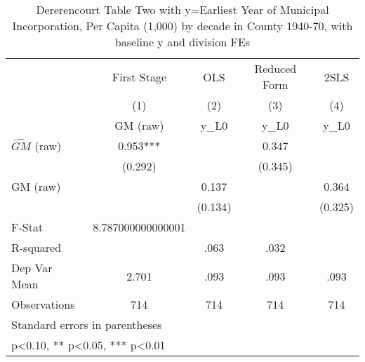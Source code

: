 \begin{table}[htbp]\centering
\def\sym#1{\ifmmode^{#1}\else\(^{#1}\)\fi}
\caption{Dererencourt Table Two with y=Earliest Year of Municipal Incorporation, Per Capita (1,000) by decade in County 1940-70, with baseline y and division FEs}
\begin{tabular}{l*{4}{c}}
\toprule
                    & First Stage   &         OLS   &Reduced Form   &        2SLS   \\
                    &\multicolumn{1}{c}{(1)}&\multicolumn{1}{c}{(2)}&\multicolumn{1}{c}{(3)}&\multicolumn{1}{c}{(4)}\\
                    &\multicolumn{1}{c}{GM  (raw)}&\multicolumn{1}{c}{y\_L0}&\multicolumn{1}{c}{y\_L0}&\multicolumn{1}{c}{y\_L0}\\
\midrule
$\hat{GM}$ (raw)    &       0.953***&               &       0.347   &               \\
                    &     (0.292)   &               &     (0.345)   &               \\
\addlinespace
GM  (raw)           &               &       0.137   &               &       0.364   \\
                    &               &     (0.134)   &               &     (0.325)   \\
\midrule
F-Stat              &8.787000000000001   &               &               &               \\
R-squared           &               &        .063   &        .032   &               \\
Dep Var Mean        &       2.701   &        .093   &        .093   &        .093   \\
Observations        &         714   &         714   &         714   &         714   \\
\bottomrule
\multicolumn{5}{l}{\footnotesize Standard errors in parentheses}\\
\multicolumn{5}{l}{\footnotesize * p<0.10, ** p<0.05, *** p<0.01}\\
\end{tabular}
\end{table}
